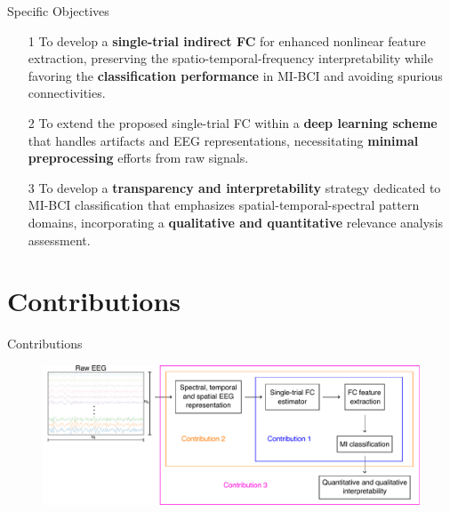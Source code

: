 \documentclass[aspectratio=169]{beamer}
\begin{document}
\begin{frame}{Specific Objectives}
\centering
\begin{itemize}
    \setlength\itemsep{2em}
	\item[1] To develop a \textbf{single-trial indirect FC} for enhanced nonlinear feature extraction, preserving the spatio-temporal-frequency interpretability while favoring the \textbf{classification performance} in MI-BCI and avoiding spurious connectivities.
 
	\item[2] To extend the proposed single-trial FC within a \textbf{deep learning scheme} that handles artifacts and EEG representations, necessitating \textbf{minimal preprocessing} efforts from raw signals.
 
	\item[3] To develop a \textbf{transparency and interpretability} strategy dedicated to MI-BCI classification that emphasizes spatial-temporal-spectral pattern domains, incorporating a \textbf{qualitative and quantitative} relevance analysis assessment.
\end{itemize}
\end{frame}

\section{Contributions}

\begin{frame}{Contributions}
    \begin{figure}[h!]
        \centering
        \includegraphics[scale=0.65]{../Tesis_document/Figures/outline_and_contributions/general_contributions.pdf}
    \end{figure}
\end{frame}
\end{document}
